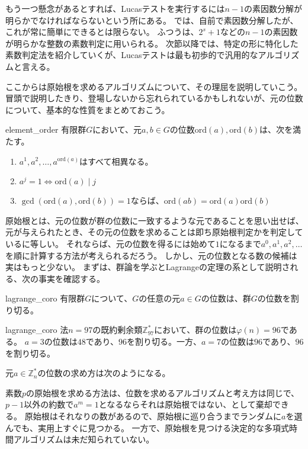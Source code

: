もう一つ懸念があるとすれば、Lucasテストを実行するには$n-1$の素因数分解が明らかでなければならないという所にある。
では、自前で素因数分解したが、これが常に簡単にできるとは限らない。
ふつうは、$2^s+1$などの$n-1$の素因数が明らかな整数の素数判定に用いられる。
次節以降では、特定の形に特化した素数判定法を紹介していくが、Lucasテストは最も初歩的で汎用的なアルゴリズムと言える。

ここからは原始根を求めるアルゴリズムについて、その理屈を説明していこう。
冒頭で説明したきり、登場しないから忘れられているかもしれないが、元の位数について、基本的な性質をまとめておこう。

\begin{Prop}{}{element_order}
有限群$G$において、元$a,b\in G$の位数$\mbox{ord}(a), \mbox{ord}(b)$は、次を満たす。
\begin{enumerate}
\item $a^1,a^2,\ldots,a^{\mbox{ord}(a)}$はすべて相異なる。
\item $a^j=1 \iff \mbox{ord}(a) \mid j$
\item $\gcd(\mbox{ord}(a), \mbox{ord}(b))=1$ならば、$\mbox{ord}(ab)=\mbox{ord}(a)\mbox{ord}(b)$
\end{enumerate}
\end{Prop}

原始根とは、元の位数が群の位数に一致するような元であることを思い出せば、元が与えられたとき、その元の位数を求めることは即ち原始根判定かを判定しているに等しい。
それならば、元の位数を得るには始めて$1$になるまで$a^0, a^1, a^2, \ldots$を順に計算する方法が考えられるだろう。
しかし、元の位数となる数の候補は実はもっと少ない。
まずは、群論を学ぶとLagrangeの定理の系として説明される、次の事実を確認する。

\begin{Prop}{}{lagrange_coro}
有限群$G$について、$G$の任意の元$a\in G$の位数は、群$G$の位数を割り切る。
\end{Prop}

\begin{Exam}{}{lagrange_coro}
法$n=97$の既約剰余類$\mathbb{Z}_{97}^*$において、群の位数は$\varphi(n)=96$である。
$a=3$の位数は$48$であり、$96$を割り切る。一方、$a=7$の位数は$96$であり、$96$を割り切る。
\end{Exam}

元$a \in \mathbb{Z}_n^*$の位数の求め方は次のようになる。


素数$p$の原始根を求める方法は、位数を求めるアルゴリズムと考え方は同じで、$p-1$以外の約数で$a^{m}=1$となるならそれは原始根ではない、として棄却できる。
原始根はそれなりの数があるので、原始根に巡り合うまでランダムに$a$を選んでも、実用上すぐに見つかる。
一方で、原始根を見つける決定的な多項式時間アルゴリズムは未だ知られていない。

